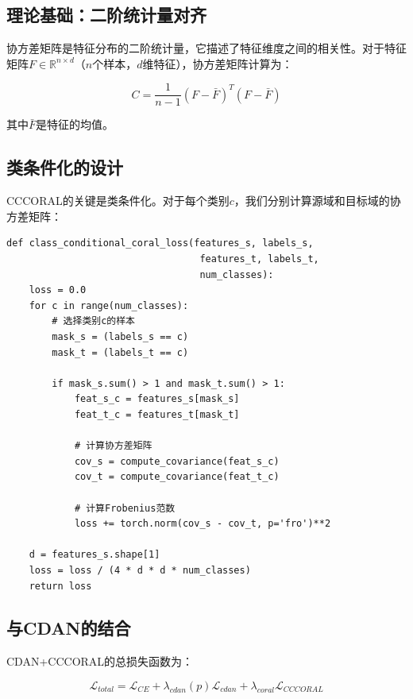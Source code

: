 \documentclass[12pt,a4paper]{ctexart}
\begin{document}
\subsection{理论基础：二阶统计量对齐}

协方差矩阵是特征分布的二阶统计量，它描述了特征维度之间的相关性。对于特征矩阵$F \in \mathbb{R}^{n \times d}$（$n$个样本，$d$维特征），协方差矩阵计算为：

\begin{equation}
C = \frac{1}{n-1}(F - \bar{F})^T(F - \bar{F})
\end{equation}

其中$\bar{F}$是特征的均值。

\subsection{类条件化的设计}

CCCORAL的关键是类条件化。对于每个类别$c$，我们分别计算源域和目标域的协方差矩阵：

\begin{verbatim}
def class_conditional_coral_loss(features_s, labels_s, 
                                  features_t, labels_t, 
                                  num_classes):
    loss = 0.0
    for c in range(num_classes):
        # 选择类别c的样本
        mask_s = (labels_s == c)
        mask_t = (labels_t == c)
        
        if mask_s.sum() > 1 and mask_t.sum() > 1:
            feat_s_c = features_s[mask_s]
            feat_t_c = features_t[mask_t]
            
            # 计算协方差矩阵
            cov_s = compute_covariance(feat_s_c)
            cov_t = compute_covariance(feat_t_c)
            
            # 计算Frobenius范数
            loss += torch.norm(cov_s - cov_t, p='fro')**2
    
    d = features_s.shape[1]
    loss = loss / (4 * d * d * num_classes)
    return loss
\end{verbatim}

\subsection{与CDAN的结合}

CDAN+CCCORAL的总损失函数为：

\begin{equation}
\mathcal{L}_{total} = \mathcal{L}_{CE} + \lambda_{cdan}(p) \mathcal{L}_{cdan} + \lambda_{coral} \mathcal{L}_{CCCORAL}
\end{equation}
\end{document}

